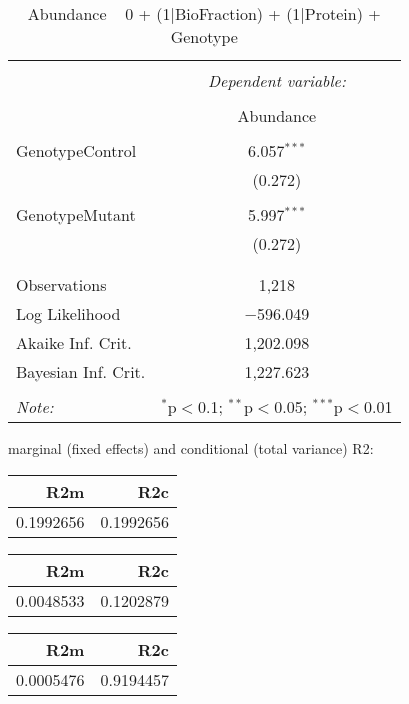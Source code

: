 \documentclass[11pt]{report}
\begin{document}
\begin{table}[!htbp] \centering 
  \caption{Abundance ~ 0 + (1|BioFraction) + (1|Protein) + Genotype} 
  \label{} 
\begin{tabular}{@{\extracolsep{5pt}}lc} 
\\[-1.8ex]\hline 
\hline \\[-1.8ex] 
 & \multicolumn{1}{c}{\textit{Dependent variable:}} \\ 
\cline{2-2} 
\\[-1.8ex] & Abundance \\ 
\hline \\[-1.8ex] 
 GenotypeControl & 6.057$^{***}$ \\ 
  & (0.272) \\ 
  & \\ 
 GenotypeMutant & 5.997$^{***}$ \\ 
  & (0.272) \\ 
  & \\ 
\hline \\[-1.8ex] 
Observations & 1,218 \\ 
Log Likelihood & $-$596.049 \\ 
Akaike Inf. Crit. & 1,202.098 \\ 
Bayesian Inf. Crit. & 1,227.623 \\ 
\hline 
\hline \\[-1.8ex] 
\textit{Note:}  & \multicolumn{1}{r}{$^{*}$p$<$0.1; $^{**}$p$<$0.05; $^{***}$p$<$0.01} \\ 
\end{tabular} 
\end{table} 
marginal (fixed effects) and conditional (total variance) R2:

\begin{tabular}{r|r}
\hline
R2m & R2c\\
\hline
0.1992656 & 0.1992656\\
\hline
\end{tabular}

\begin{tabular}{r|r}
\hline
R2m & R2c\\
\hline
0.0048533 & 0.1202879\\
\hline
\end{tabular}

\begin{tabular}{r|r}
\hline
R2m & R2c\\
\hline
0.0005476 & 0.9194457\\
\hline
\end{tabular}
\end{document}
